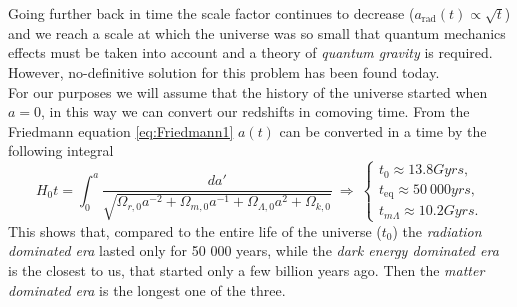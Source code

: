 Going further back in time the scale factor continues to decrease ($a_\text{rad}(t)\propto\sqrt{t}$) and we reach a scale at which the universe was so small that quantum mechanics effects must be taken into account and a theory of \emph{quantum gravity} is required. However, no-definitive solution for this problem has been found today.\\ For our purposes we will assume that the history of the universe started when $a=0$, in this way we can convert our redshifts in comoving time. From the Friedmann equation \eqref{eq:Friedmann1} $a(t)$ can be converted in a time by the following integral$$H_0t=\int_{0}^{a}\frac{da'}{\sqrt{\Omega_{r,0}a^{-2}+\Omega_{m,0}a^{-1}+\Omega_{\Lambda,0}a^{2}+\Omega_{k,0}}}\ \Rightarrow\ \begin{cases}
    t_0\approx13.8Gyrs,\\
    t_\text{eq}\approx 50\ 000yrs,\\
    t_{m\Lambda}\approx10.2Gyrs.
\end{cases}$$
This shows that, compared to the entire life of the universe ($t_0$) the \emph{radiation dominated era} lasted  only for 50 000 years, while the \emph{dark energy dominated era} is the closest to us, that started only a few billion years ago. Then the \emph{matter dominated era} is the longest one of the three. 




